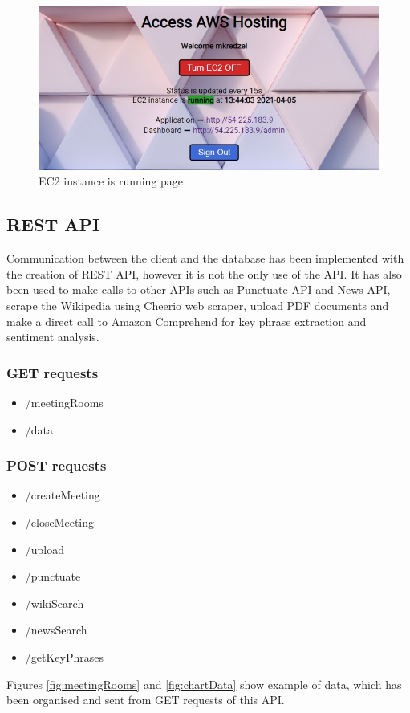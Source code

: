 \documentclass{article}
\begin{document}
\vspace{20pt}

\begin{figure}[H]
  \centering
  \includegraphics[scale=0.8]{implementation/ec2off.jpg}
  \caption{EC2 instance is running page}
  \label{fig:ec2off}
\end{figure}

\newpage
\subsection{REST API}
{\large 
Communication between the client and the database has been implemented with the creation of REST API, however it is not the only use of the API. It has also been used to make calls to other APIs such as Punctuate API and News API, scrape the Wikipedia using Cheerio web scraper, upload PDF documents and make a direct call to Amazon Comprehend for key phrase extraction and sentiment analysis.\par

\subsubsection{GET requests}

\begin{itemize}
    \item /meetingRooms
    \item /data
\end{itemize}

\subsubsection{POST requests}

\begin{itemize}
    \item /createMeeting
    \item /closeMeeting
    \item /upload
    \item /punctuate
    \item /wikiSearch
    \item /newsSearch
    \item /getKeyPhrases
\end{itemize}

Figures \ref{fig:meetingRooms} and \ref{fig:chartData} show example of data, which has been organised and sent from GET requests of this API.\par
}
\end{document}
